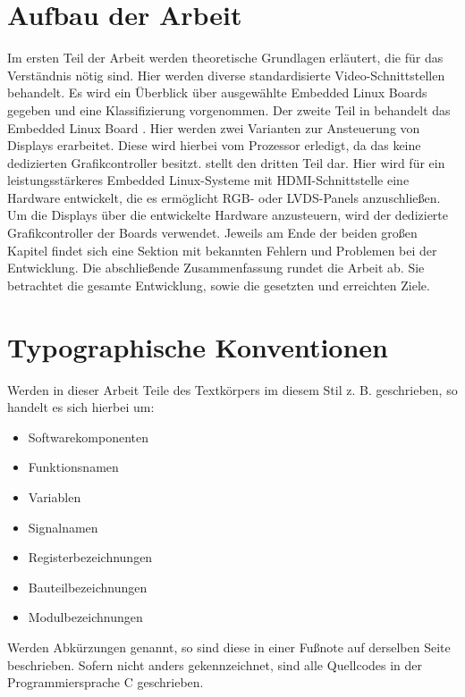 \section{Aufbau der Arbeit}
Im ersten Teil der Arbeit werden theoretische Grundlagen erläutert, die für das Verständnis nötig sind. Hier werden diverse standardisierte Video-Schnittstellen behandelt. Es wird ein Überblick über ausgewählte Embedded Linux Boards gegeben und eine Klassifizierung vorgenommen.\newline
Der zweite Teil in  behandelt das Embedded Linux Board . Hier werden zwei Varianten zur Ansteuerung von Displays erarbeitet. Diese wird hierbei vom Prozessor erledigt, da das  keine dedizierten Grafikcontroller besitzt.\newline
{} stellt den dritten Teil dar. Hier wird für ein leistungsstärkeres Embedded Linux-Systeme  mit HDMI-Schnittstelle eine Hardware entwickelt, die es ermöglicht RGB- oder LVDS-Panels anzuschließen. Um die Displays über die entwickelte Hardware anzusteuern, wird der dedizierte Grafikcontroller der Boards verwendet. Jeweils am Ende der beiden großen Kapitel findet sich eine Sektion mit bekannten Fehlern und Problemen bei der Entwicklung. \newline
Die abschließende Zusammenfassung rundet die Arbeit ab. Sie betrachtet die gesamte Entwicklung, sowie die gesetzten und erreichten Ziele.

\section{Typographische Konventionen}
Werden in dieser Arbeit Teile des Textkörpers im diesem Stil z. B.  geschrieben, so handelt es sich hierbei um:
\begin{itemize}
\item Softwarekomponenten
\item Funktionsnamen
\item Variablen
\item Signalnamen
\item Registerbezeichnungen
\item Bauteilbezeichnungen
\item Modulbezeichnungen
\end{itemize}
Werden Abkürzungen genannt, so sind diese in einer Fußnote auf derselben Seite beschrieben.
Sofern nicht anders gekennzeichnet, sind alle Quellcodes in der Programmiersprache C geschrieben.
